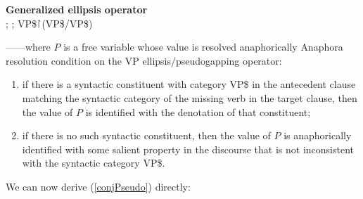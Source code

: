 \documentclass[output=paper,colorlinks,citecolor=brown]{langscibook}
\begin{document}
\begin{exe}
 \ex\label{generalized}
  \textbf{Generalized ellipsis operator} \\
  ; ; VP\$\ensuremath{\vs}(VP\$/VP\$)
  
  ------where $P$ is a free variable whose value is
  resolved anaphorically
 \ex\label{Acondition}
  Anaphora resolution condition on the VP ellipsis/pseudogapping
  operator:
  \begin{enumerate}
   \item 
    if there is a syntactic  constituent
    with category VP\$ in the antecedent clause matching the
    syntactic  category of the missing verb in the target clause,
    then the value of $P$ is identified with the denotation of that constituent;
   \item 
    if there is no such syntactic  constituent, then the value of $P$  is anaphorically
    identified with some salient property in the discourse that is not
    inconsistent with the syntactic  category VP\$.
  \end{enumerate}
\end{exe}
We can now derive (\ref{conjPseudo}) directly:
\end{document}
